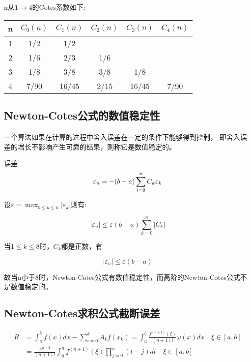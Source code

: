 \documentclass[12pt]{report}
\begin{document}
n从$1 \to 4$的Cotes系数如下:

\begin{center}
	\begin{tabular}{cccccc}
		\hline
		n & $C_0(n)$ & $C_1(n)$ & $C_2(n)$ & $C_3(n)$ & $C_4(n)$\\
		\hline
		1 & 1/2 & 1/2 \\
		\hline
		2 & 1/6 & 2/3 & 1/6 \\
		\hline
		3 & 1/8 & 3/8 & 3/8 & 1/8 \\
		\hline
		4 & 7/90 & 16/45 & 2/15 & 16/45 & 7/90 \\
		\hline
	\end{tabular}
\end{center}


\subsection{Newton-Cotes公式的数值稳定性}

\paragraph{ } 一个算法如果在计算的过程中舍入误差在一定的条件下能够得到控制，
即舍入误差的增长不影响产生可靠的结果，则称它是数值稳定的。

误差
\begin{equation}
	\begin{aligned}
		\notag
		\varepsilon_n = -(b-a)\sum_{i=0}^{n} C_k \varepsilon_k
	\end{aligned}
	\notag
\end{equation}

设$\varepsilon = \max_{0 \leq k \leq n} |\varepsilon_k|$则有:

\[
	|\varepsilon_n| \leq \varepsilon (b - a) \sum_{k=0}^{n}|C_k|
\]

当$1 \le k \le 8$时，$C_k$都是正数，有

\[
	|\varepsilon_n| \leq \varepsilon (b - a)
\]

故当n小于8时，Newton-Cotes公式有数值稳定性，而高阶的Newton-Cotes公式不是数值稳定的。

\subsection{Newton-Cotes求积公式截断误差}

\begin{equation} \tag{3.7} \label{3.7}
	\begin{aligned}
		R &= \int_{a}^{b} f(x) dx - \sum_{i=0}^{k}A_k f(x_k) = \int_{a}^{b} \frac{f^{(n+1)}(\xi)}{(n+1)!}\omega (x) dx \quad \xi \in [a, b]\\
		&= \frac{h^{n+2}}{(n+1)!} \int_{0}^{n} f^{(n+1)}(\xi) \prod_{j=0}^{n} (t - j) dt \quad \xi \in [a, b]
	\end{aligned}
\end{equation}
\end{document}

